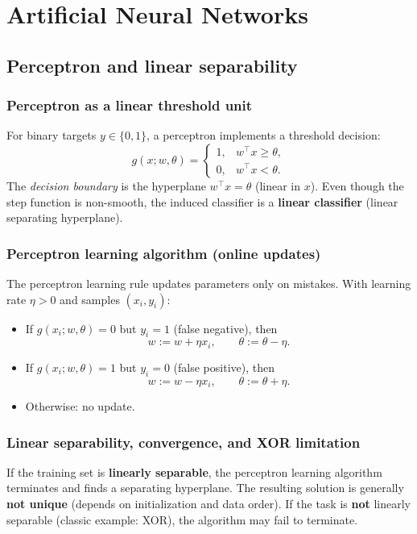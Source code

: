 \documentclass[11pt, oneside]{book}
\newcommand{\1}{\ind}                       %
\begin{document}
\chapter{Artificial Neural Networks}

\section{Perceptron and linear separability}
\subsection{Perceptron as a linear threshold unit}
For binary targets $y\in\{0,1\}$, a perceptron implements a threshold decision:
\[
g(x;w,\theta)=
\begin{cases}
1, & w^\top x \ge \theta,\\
0, & w^\top x < \theta.
\end{cases}
\]
The \emph{decision boundary} is the hyperplane $w^\top x=\theta$ (linear in $x$). Even though the step function is non-smooth, the induced classifier is a \textbf{linear classifier} (linear separating hyperplane).

\subsection{Perceptron learning algorithm (online updates)}
The perceptron learning rule updates parameters only on mistakes. With learning rate $\eta>0$ and samples $(x_i,y_i)$:
\begin{itemize}
  \item If $g(x_i;w,\theta)=0$ but $y_i=1$ (false negative), then
  \[
    w := w + \eta x_i,\qquad \theta := \theta - \eta.
  \]
  \item If $g(x_i;w,\theta)=1$ but $y_i=0$ (false positive), then
  \[
    w := w - \eta x_i,\qquad \theta := \theta + \eta.
  \]
  \item Otherwise: no update.
\end{itemize}

\subsection{Linear separability, convergence, and XOR limitation}
If the training set is \textbf{linearly separable}, the perceptron learning algorithm terminates and finds a separating hyperplane. The resulting solution is generally \textbf{not unique} (depends on initialization and data order).
If the task is \textbf{not} linearly separable (classic example: XOR), the algorithm may fail to terminate.
\end{document}
